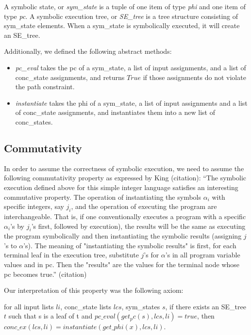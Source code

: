 A symbolic state, or \textit{sym\_state} is a tuple of one item of type \textit{phi} and one item of type \textit{pc}.
A symbolic execution tree, or \textit{SE\_tree} is a tree structure consisting of sym\_state elements. 
When a sym\_state is symbolically executed, it will create an SE\_tree.

Additionally, we defined the following abstract methods:
\begin{itemize}
\item \textit{pc\_eval} takes the pc of a sym\_state, a list of input assignments, and a list of conc\_state assignments, and returns $True$ if those assignments do not violate the path constraint.
\item \textit{instantiate} takes the phi of a sym\_state, a list of input assignments and a list of conc\_state assignments, and instantiates them into a new list of conc\_states.
\end{itemize}


\subsection{Commutativity}
In order to assume the correctness of symbolic execution, we need to assume the following commutativity property as expressed by King (citation):
``The symbolic execution defined above for this simple
integer language satisfies an interesting commutative
property. The operation of instantiating the symbols
{$\alpha_i$} with specific integers, say {$j_i$}, and the operation of
executing the program are interchangeable. That is, if
one conventionally executes a program with a specific
$\alpha_i$'s by
$j_i$'s first, followed by execution), the results will be the
same as executing the program symbolically and then
instantiating the symbolic results (assigning $j$'s to $\alpha$'s).
The meaning of "instantiating the symbolic results" is
first, for each terminal leaf in the execution tree, substitute
$j$'s for $\alpha$'s in all program variable values and in
pc. Then the "results" are the values for the terminal 
node whose pc becomes true.'' (citation)


Our interpretation of this property was the following axiom:
\begin{axiom}
for all input lists $li$, conc\_state lists $lcs$, sym\_states $s$,
if there exists an SE\_tree $t$ such that
s is a leaf of t and
$pc\_eval (get_pc(s), lcs, li) = true$,
then
$conc\_ex(lcs, li) = instantiate (get\_phi (x), lcs, li)$.
\end{axiom}

